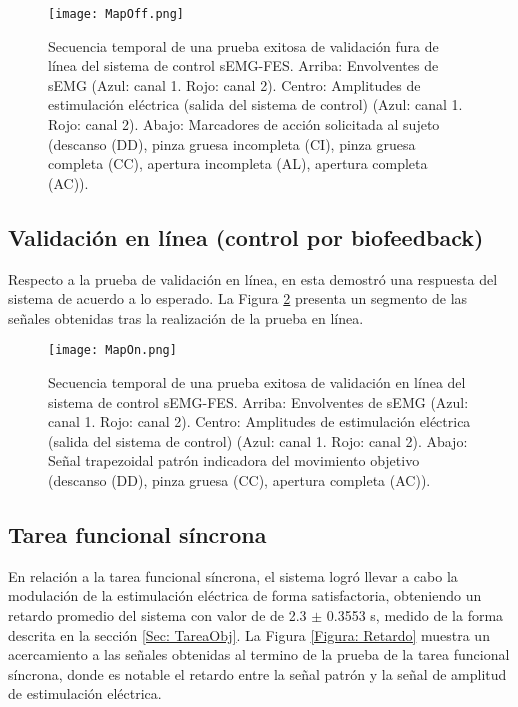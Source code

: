 \begin{figure}[htbp]
	\centering
	\texttt{[image: MapOff.png]}
	\caption[Secuencia temporal de una prueba exitosa de validación fuera de línea]{Secuencia temporal de una prueba exitosa de validación fura de línea del sistema de control sEMG-FES. Arriba: Envolventes de sEMG (Azul: canal 1. Rojo: canal 2). Centro: Amplitudes de estimulación eléctrica (salida del sistema de control) (Azul: canal 1. Rojo: canal 2). Abajo: Marcadores de acción solicitada al sujeto (descanso (DD), pinza gruesa incompleta (CI), pinza gruesa completa (CC), apertura incompleta (AL), apertura completa (AC)).}
	\label{Figura: MapOff}
\end{figure}


\newpage
\subsection{Validación en línea (control por biofeedback)}
Respecto a la prueba de validación en línea, en esta demostró una respuesta del sistema de acuerdo a lo esperado. La Figura \ref{Figura: MapOn} presenta un segmento de las señales obtenidas tras la realización de la prueba en línea.

\begin{figure}[htbp]
	\centering
	\texttt{[image: MapOn.png]}
	\caption[Secuencia temporal de una prueba exitosa de validación en línea]{Secuencia temporal de una prueba exitosa de validación en línea del sistema de control sEMG-FES.  Arriba: Envolventes de sEMG (Azul: canal 1. Rojo: canal 2). Centro: Amplitudes de estimulación eléctrica (salida del sistema de control) (Azul: canal 1. Rojo: canal 2). Abajo: Señal trapezoidal patrón indicadora del movimiento objetivo (descanso (DD), pinza gruesa (CC), apertura completa (AC)).}
	\label{Figura: MapOn}
\end{figure}


\newpage
\subsection{Tarea funcional síncrona}
En relación a la tarea funcional síncrona, el sistema logró llevar a cabo la modulación de la estimulación eléctrica de forma satisfactoria, obteniendo un retardo promedio del sistema con valor de de 2.3 $\pm$ 0.3553 s, medido de la forma descrita en la sección \ref{Sec: TareaObj}. La Figura \ref{Figura: Retardo} muestra un acercamiento a las señales obtenidas al termino de la prueba de la tarea funcional síncrona, donde es notable el retardo entre la señal patrón y la señal de amplitud de estimulación eléctrica.

